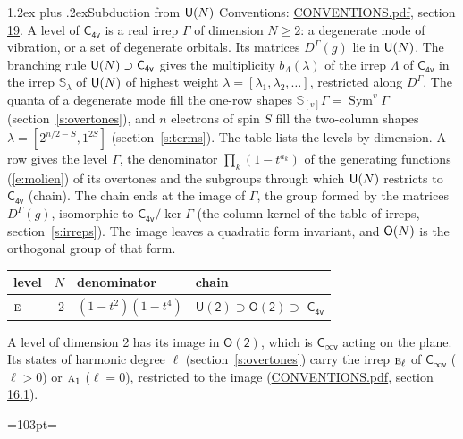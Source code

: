 \documentclass[10pt,a4paper]{article}
\makeatletter
\renewcommand\section{\@startsection{section}{1}{\z@}{-3ex plus -1ex minus -.2ex}%
  {1.2ex plus .2ex}{\normalfont\large\sffamily\bfseries\color{parttitle}}}
\newcommand{\needspace}[1]{\par\penalty-100\begingroup\dimen0=#1\relax\dimen2=\pagegoal
  \advance\dimen2-\pagetotal\ifdim\dimen0>\dimen2\relax\ifdim\dimen2>0pt\vfil\break\fi\fi
  \endgroup}
\numberwithin{equation}{section}
\newcommand{\grp}[1]{\mathsf{#1}}
\newcommand{\irr}[1]{\text{\normalfont\scshape #1}}
\newcommand{\repD}[1]{D^{#1}}
\newcommand{\schur}[1]{\mathbb{S}_{#1}}
\newcommand{\shape}[1]{[#1]}
\makeatother
\begin{document}
\section{Subduction from \texorpdfstring{$\grp{U(\mathnormal{N})}$}{U(N)}}\label{s:unitary}
Conventions: \href{../../CONVENTIONS.pdf}{CONVENTIONS.pdf}, section \href{../../CONVENTIONS.pdf\#conv.19}{19}.
\leavevmode\label{n:local.level.dimension}A level of $\grp{C_{4v}}$ is a real irrep $\Gamma$ of dimension $N \ge 2$: a degenerate mode of vibration, or a set of degenerate orbitals. \label{n:group.unitary}Its matrices $\repD{\Gamma}(g)$ lie in $\grp{U(\mathnormal{N})}$. \label{n:irrep.schur}\label{n:shape.partition}\label{n:local.partition}\label{n:function.multiplicity.unitary}The branching rule $\grp{U(\mathnormal{N})} \supset \grp{C_{4v}}$ gives the multiplicity $b_\Lambda(\lambda)$ of the irrep $\Lambda$ of $\grp{C_{4v}}$ in the irrep $\schur{\lambda}$ of $\grp{U(\mathnormal{N})}$ of highest weight $\lambda = \shape{\lambda_1, \lambda_2, \dots}$, restricted along $\repD{\Gamma}$. \label{n:local.partition.power}\label{n:local.electrons}\label{n:local.spin}The quanta of a degenerate mode fill the one-row shapes $\schur{\shape{v}}\Gamma = \operatorname{Sym}^{v}\Gamma$ (section~\ref{s:overtones}), and $n$ electrons of spin $S$ fill the two-column shapes $\lambda = \shape{2^{n/2-S}, 1^{2S}}$ (section~\ref{s:terms}).
The table lists the levels by dimension. \label{n:head.level}\label{n:head.denominator}\label{n:index.overtone.denominator}\label{n:head.chain}A row gives the level $\Gamma$, the denominator $\prod_k (1 - t^{a_k})$ of the generating functions (\ref{e:molien}) of its overtones and the subgroups through which $\grp{U(\mathnormal{N})}$ restricts to $\grp{C_{4v}}$ (chain). The chain ends at the image of $\Gamma$, the group formed by the matrices $\repD{\Gamma}(g)$, isomorphic to $\grp{C_{4v}}/\ker\Gamma$ (the column kernel of the table of irreps, section~\ref{s:irreps}). The image leaves a quadratic form invariant, and $\grp{O(\mathnormal{N})}$ is the orthogonal group of that form.
{\small\begin{longtable}{@{}lrll@{}}\toprule
level & $N$ & denominator & chain\\\midrule\endhead
\bottomrule\endfoot\endlastfoot
$\irr{e}$ & 2 & $(1-t^{2})(1-t^{4})$ & $\grp{U(2)} \supset \grp{O(2)} \supset$ \href{C4v.pdf}{$\grp{C_{4v}}$}\\
\bottomrule\end{longtable}}
A level of dimension 2 has its image in $\grp{O(2)}$, which is \href{Cinfv.pdf}{$\grp{C_{\infty v}}$} acting on the plane. \label{n:index.harmonic.degree}Its states of harmonic degree $\ell$ (section~\ref{s:overtones}) carry the irrep $\irr{e}_{\ell}$ of \href{Cinfv.pdf}{$\grp{C_{\infty v}}$} ($\ell > 0$) or $\irr{a}_{1}$ ($\ell = 0$), restricted to the image (\href{../../CONVENTIONS.pdf}{CONVENTIONS.pdf}, section \href{../../CONVENTIONS.pdf\#conv.16.1}{16.1}).
\needspace{103pt}
\end{document}
